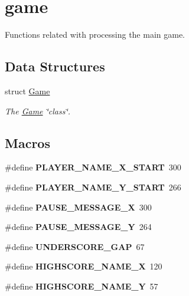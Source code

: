 \hypertarget{group__game}{}\section{game}
\label{group__game}


Functions related with processing the main game.  


\subsection*{Data Structures}
\begin{DoxyCompactItemize}
\item 
struct \hyperlink{struct_game}{Game}
\begin{DoxyCompactList}\small\item\em The \hyperlink{struct_game}{Game} \char`\"{}class\char`\"{}. \end{DoxyCompactList}\end{DoxyCompactItemize}
\subsection*{Macros}
\begin{DoxyCompactItemize}
\item 
\hypertarget{group__game_gabbbd2c8ccad22d7c741d231c59ad2aae}{}\label{group__game_gabbbd2c8ccad22d7c741d231c59ad2aae} 
\#define {\bfseries P\+L\+A\+Y\+E\+R\+\_\+\+N\+A\+M\+E\+\_\+\+X\+\_\+\+S\+T\+A\+RT}~300
\item 
\hypertarget{group__game_gaeff0876f335ad4ffc53f1bb9ac2d8eb0}{}\label{group__game_gaeff0876f335ad4ffc53f1bb9ac2d8eb0} 
\#define {\bfseries P\+L\+A\+Y\+E\+R\+\_\+\+N\+A\+M\+E\+\_\+\+Y\+\_\+\+S\+T\+A\+RT}~266
\item 
\hypertarget{group__game_gaeda0eab3e9262c2e92843302ff63ca9f}{}\label{group__game_gaeda0eab3e9262c2e92843302ff63ca9f} 
\#define {\bfseries P\+A\+U\+S\+E\+\_\+\+M\+E\+S\+S\+A\+G\+E\+\_\+X}~300
\item 
\hypertarget{group__game_ga089f5e3479ccaaf4704e916101355a1f}{}\label{group__game_ga089f5e3479ccaaf4704e916101355a1f} 
\#define {\bfseries P\+A\+U\+S\+E\+\_\+\+M\+E\+S\+S\+A\+G\+E\+\_\+Y}~264
\item 
\hypertarget{group__game_ga31e018c359c6fbfa916c1e07b60ef2b9}{}\label{group__game_ga31e018c359c6fbfa916c1e07b60ef2b9} 
\#define {\bfseries U\+N\+D\+E\+R\+S\+C\+O\+R\+E\+\_\+\+G\+AP}~67
\item 
\hypertarget{group__game_gaef21145f34ea5729cf657dbcd0bda945}{}\label{group__game_gaef21145f34ea5729cf657dbcd0bda945} 
\#define {\bfseries H\+I\+G\+H\+S\+C\+O\+R\+E\+\_\+\+N\+A\+M\+E\+\_\+X}~120
\item 
\hypertarget{group__game_ga216796b17d6ca2ee2d6388cf8633102d}{}\label{group__game_ga216796b17d6ca2ee2d6388cf8633102d} 
\#define {\bfseries H\+I\+G\+H\+S\+C\+O\+R\+E\+\_\+\+N\+A\+M\+E\+\_\+Y}~57
\end{DoxyCompactItemize}
